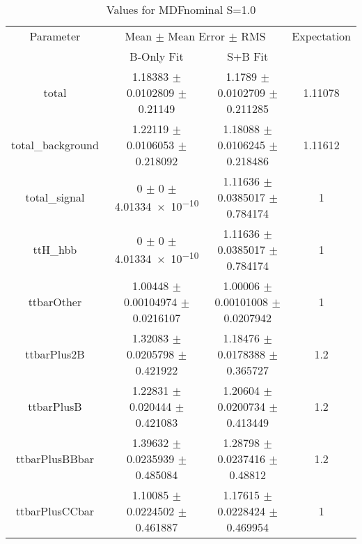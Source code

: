 \begin{table}
\centering
\caption{Values for MDFnominal S=1.0}
\begin{tabular}{cccc}
\toprule
Parameter & \multicolumn{2}{c}{Mean $\pm$ Mean Error $\pm$ RMS} & Expectation\\
 & B-Only Fit & S+B Fit & \\
\midrule
total & \num{1.18383} $\pm$ \num{0.0102809} $\pm$ \num{0.21149} & \num{1.1789} $\pm$ \num{0.0102709} $\pm$ \num{0.211285} & \num{1.11078}\\
total\_background & \num{1.22119} $\pm$ \num{0.0106053} $\pm$ \num{0.218092} & \num{1.18088} $\pm$ \num{0.0106245} $\pm$ \num{0.218486} & \num{1.11612}\\
total\_signal & \num{0} $\pm$ \num{0} $\pm$ \num{4.01334e-10} & \num{1.11636} $\pm$ \num{0.0385017} $\pm$ \num{0.784174} & \num{1}\\
ttH\_hbb & \num{0} $\pm$ \num{0} $\pm$ \num{4.01334e-10} & \num{1.11636} $\pm$ \num{0.0385017} $\pm$ \num{0.784174} & \num{1}\\
ttbarOther & \num{1.00448} $\pm$ \num{0.00104974} $\pm$ \num{0.0216107} & \num{1.00006} $\pm$ \num{0.00101008} $\pm$ \num{0.0207942} & \num{1}\\
ttbarPlus2B & \num{1.32083} $\pm$ \num{0.0205798} $\pm$ \num{0.421922} & \num{1.18476} $\pm$ \num{0.0178388} $\pm$ \num{0.365727} & \num{1.2}\\
ttbarPlusB & \num{1.22831} $\pm$ \num{0.020444} $\pm$ \num{0.421083} & \num{1.20604} $\pm$ \num{0.0200734} $\pm$ \num{0.413449} & \num{1.2}\\
ttbarPlusBBbar & \num{1.39632} $\pm$ \num{0.0235939} $\pm$ \num{0.485084} & \num{1.28798} $\pm$ \num{0.0237416} $\pm$ \num{0.48812} & \num{1.2}\\
ttbarPlusCCbar & \num{1.10085} $\pm$ \num{0.0224502} $\pm$ \num{0.461887} & \num{1.17615} $\pm$ \num{0.0228424} $\pm$ \num{0.469954} & \num{1}\\
\bottomrule
\end{tabular}
\end{table}